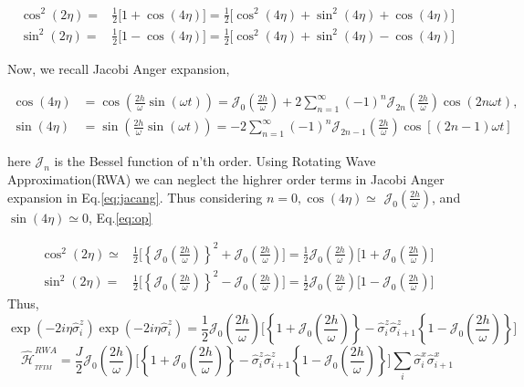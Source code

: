\documentclass[a4paper,11pt]{article}
\begin{document}
\begin{align}
\cos^2(2\eta) =& \frac12\big[1+\cos(4\eta)\big]=\frac12\big[\cos^2(4\eta)+ \sin^2(4\eta)+\cos(4\eta)\big]\nonumber\\
\sin^2(2\eta) =& \frac12\big[1-\cos(4\eta)\big]=\frac12\big[\cos^2(4\eta)+ \sin^2(4\eta)-\cos(4\eta)\big]
\label{eq:cossin}
\end{align}

Now, we recall Jacobi Anger expansion,


\begin{align}
\cos (4 \eta)&=\cos \left(\frac{2 h}{\omega} \sin (\omega t)\right)=\mathcal{J}_{0}\left(\frac{2 h}{\omega}\right)+2 \sum_{n=1}^{\infty}(-1)^{n} \mathcal{J}_{2 n}\left(\frac{2 h}{\omega}\right) \cos (2 n \omega t), \\
\sin (4 \eta)&=\sin \left(\frac{2 h}{\omega} \sin (\omega t)\right)=-2 \sum_{n=1}^{\infty}(-1)^{n} \mathcal{J}_{2 n-1}\left(\frac{2 h}{\omega}\right) \cos [(2 n-1) \omega t]
\label{eq:jacang}
\end{align}


here $\mathcal{J}_{n}$ is the Bessel function of n'th order. Using Rotating Wave Approximation(RWA) we can neglect the highrer order terms in Jacobi Anger expansion in Eq.\eqref{eq:jacang}. Thus considering $n=0, \cos (4 \eta) \simeq$ $\mathcal{J}_{0}\left(\frac{2 h}{\omega}\right)$, and $\sin (4 \eta) \simeq 0$, Eq.\eqref{eq:op}

\begin{align}
\cos^2(2\eta) \simeq& \frac12\Bigg[\left\{\mathcal{J}_0\left(\frac{2h}{\omega}\right)\right\}^2 + \mathcal{J}_0\left(\frac{2h}{\omega}\right)\Bigg]=\frac12 \mathcal{J}_0\left(\frac{2h}{\omega}\right)\Bigg[1+ \mathcal{J}_0\left(\frac{2h}{\omega}\right)\Bigg]\nonumber\\
\sin^2(2\eta) =& \frac12\Bigg[\left\{\mathcal{J}_0\left(\frac{2h}{\omega}\right)\right\}^2 - \mathcal{J}_0\left(\frac{2h}{\omega}\right)\Bigg]=\frac12 \mathcal{J}_0\left(\frac{2h}{\omega}\right)\Bigg[1- \mathcal{J}_0\left(\frac{2h}{\omega}\right)\Bigg]
\label{eq:cossin}
\end{align}
Thus,
\begin{equation}
\exp\left(-2i\eta\hat{\sigma}^z_i\right)\exp\left(-2i\eta\hat{\sigma}^z_i\right) = \frac12 \mathcal{J}_0\left(\frac{2h}{\omega}\right)\Bigg[\left\{1+ \mathcal{J}_0\left(\frac{2h}{\omega}\right)\right\} - \hat{\sigma}^z_i\hat{\sigma}^z_{i+1}\left\{1- \mathcal{J}_0\left(\frac{2h}{\omega}\right)\right\} \Bigg]
\end{equation}
\begin{equation}
\hat{\mathcal{H}}_{_{TFIM}}^{R W A}=\frac{J}{2} \mathcal{J}_0\left(\frac{2h}{\omega}\right)\Bigg[\left\{1+ \mathcal{J}_0\left(\frac{2h}{\omega}\right)\right\} - \hat{\sigma}^z_i\hat{\sigma}^z_{i+1}\left\{1- \mathcal{J}_0\left(\frac{2h}{\omega}\right)\right\} \Bigg]\sum_{i} \hat{\sigma}_{i}^{x} \hat{\sigma}_{i+1}^{x} 
\end{equation}
\end{document}
